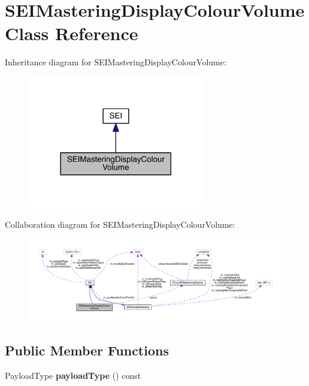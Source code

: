 \hypertarget{class_s_e_i_mastering_display_colour_volume}{}\section{S\+E\+I\+Mastering\+Display\+Colour\+Volume Class Reference}
\label{class_s_e_i_mastering_display_colour_volume}


Inheritance diagram for S\+E\+I\+Mastering\+Display\+Colour\+Volume\+:
\nopagebreak
\begin{figure}[H]
\begin{center}
\leavevmode
\includegraphics[width=218pt]{df/d95/class_s_e_i_mastering_display_colour_volume__inherit__graph}
\end{center}
\end{figure}


Collaboration diagram for S\+E\+I\+Mastering\+Display\+Colour\+Volume\+:
\nopagebreak
\begin{figure}[H]
\begin{center}
\leavevmode
\includegraphics[width=350pt]{d5/d58/class_s_e_i_mastering_display_colour_volume__coll__graph}
\end{center}
\end{figure}
\subsection*{Public Member Functions}
\begin{DoxyCompactItemize}
\item 
\mbox{\label{class_s_e_i_mastering_display_colour_volume_ad599f5f13901472ccef4ac1a009f1dd4}} 
Payload\+Type {\bfseries payload\+Type} () const
\end{DoxyCompactItemize}
